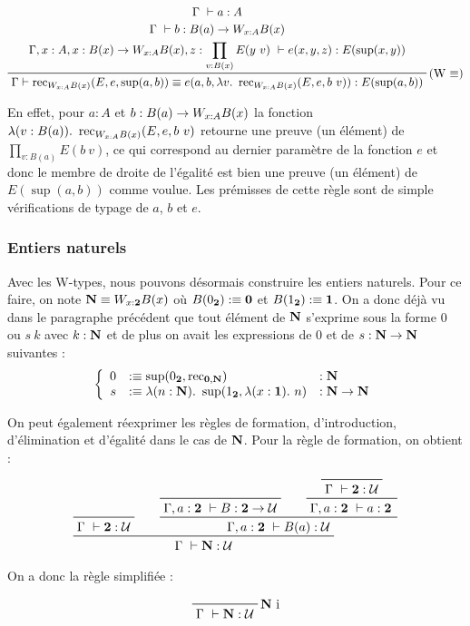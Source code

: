 \documentclass[../../rapport.tex]{subfiles}
\begin{document}
  $$
  \prfinterspace=2em
  \prftree[r]{(W $\equiv$)}
    {\prfStackPremises
      {\Gamma\ \vdash a : A}
      {\Gamma\ \vdash b : B(a) \fun W_{x:A}B(x)}
      {\Gamma, x : A, x : B(x) \fun W_{x:A}B(x), z : \prod_{v:B(x)}{E(y\ v)}\ \vdash e(x, y, z) : E(\sup(x, y))}
    }
      {\Gamma \vdash \rec_{W_{x:A}B(x)}(E, e, \sup(a, b)) \equiv e(a, b, \lambda v.\ \rec_{W_{x:A}B(x)}(E, e, b\ v)) : E(\sup(a, b))}
  $$

  En effet, pour $a : A$ et $b : B(a) \rightarrow W_{x:A}B(x)$ la fonction $\lambda(v : B(a)).\ \rec_{W_{x:A}B(x)}(E, e, b\ v)$
  retourne une preuve (un élément) de $\prod_{v : B(a)}{E(b \ v)}$, ce qui correspond au
  dernier paramètre de la fonction $e$ et donc le membre de droite de l'égalité est bien une preuve (un élément)
  de $E(\sup(a, b))$ comme voulue.
  Les prémisses de cette règle sont de simple vérifications de typage de $a$, $b$ et $e$.

  \subsubsection{Entiers naturels}

  Avec les W-types, nous pouvons désormais construire les entiers naturels.
  Pour ce faire, on note $\mathbf N \equiv W_{x : \operatorname{\textbf{2}}}B(x)$ où $B(0_{\operatorname{\textbf{2}}}) :\equiv \operatorname{\textbf{0}}$ et $B(1_{\operatorname{\textbf{2}}}) :\equiv \operatorname{\textbf{1}}$.
  On a donc déjà vu dans le paragraphe précédent que tout élément de $\mathbf N$ s'exprime sous la forme $0$ ou $s\ k$
  avec $k : \mathbf N$ et de plus on avait les expressions de $0$ et de $s : \mathbf N \rightarrow \mathbf N$ suivantes :
  $$\left\{ \begin{array}{rll}
      0 &:\equiv \sup(0_{\2}, \rec_{\0, \N}) 				&: \N \\
      s &:\equiv \lambda(n : \N).\ \sup(1_{\2}, \lambda(x : \1).\ n)	&: \N \fun \N
  \end{array}\right.$$

  On peut également réexprimer les règles de formation, d'introduction, d'élimination et d'égalité dans le cas de $\mathbf N$.
  Pour la règle de formation, on obtient :

  $$
  \prfinterspace=2em
  \prftree
    {\prfaxiom{\Gamma\ \vdash \2 : \U}}
    {\prftree
      {\prfaxiom{\Gamma, a : \2\ \vdash B : \2 \fun \U}}
      {\prftree
	{\prfaxiom{\Gamma\ \vdash \2 : \U}}
      {\Gamma, a : \2\ \vdash a : \2}}
    {\Gamma, a : \2\ \vdash B(a) : \U}}
  {\Gamma\ \vdash \N : \U}
  $$

  On a donc la règle simplifiée :

  $$
  \prfbyaxiom{$\N$ i}
    {\Gamma\ \vdash \N : \U}
  $$
\end{document}
